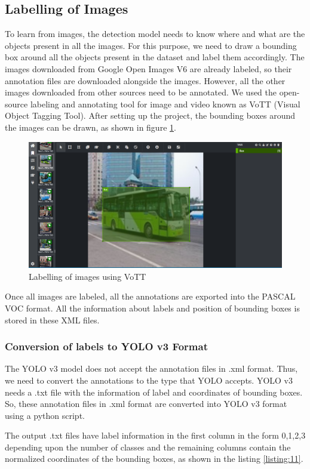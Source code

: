  \subsection{Labelling of Images}
 To learn from images, the detection model needs to know where and what are the objects present in all the images. For this purpose, we need to draw a bounding box around all the objects present in the dataset and label them accordingly. The images downloaded from Google Open Images V6 are already labeled, so their annotation files are downloaded alongside the images. However, all the other images downloaded from other sources need to be annotated. We used the open-source labeling and annotating tool for image and video known as VoTT (Visual Object Tagging Tool). After setting up the project, the bounding boxes around the images can be drawn, as shown in figure \ref{fig:5.7}.
\begin{figure}
\centering
\captionsetup{justification = centering}
\includegraphics[scale= 0.35]{CHAPTERS/Chapter-5/images/5.7.PNG}
\caption{Labelling of images using VoTT } 
\label{fig:5.7}
\end{figure}
Once all images are labeled, all the annotations are exported into the PASCAL VOC format. All the information about labels and position of bounding boxes is stored in these XML files.
\subsubsection*{Conversion of labels to YOLO v3 Format}
The YOLO v3 model does not accept the annotation files in .xml format.
Thus, we need to convert the annotations to the type that YOLO accepts.
YOLO v3 needs a .txt file with the information of label and coordinates
of bounding boxes. So, these annotation files in .xml format are converted
into YOLO v3 format using a python script. 

The output .txt files have label information in the first column
in the form 0,1,2,3 depending upon the number of classes and the
remaining columns contain the normalized coordinates of the bounding
boxes, as shown in the listing \ref{listing:11}.

